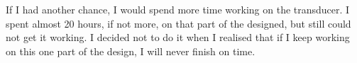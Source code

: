 \par
If I had another chance, I would spend more time working on the transducer. I spent almost 20 hours, if not more, on that part of the designed, but still could not get it working. I decided not to do it when I realised that if I keep working on this one part of the design, I will never finish on time.
